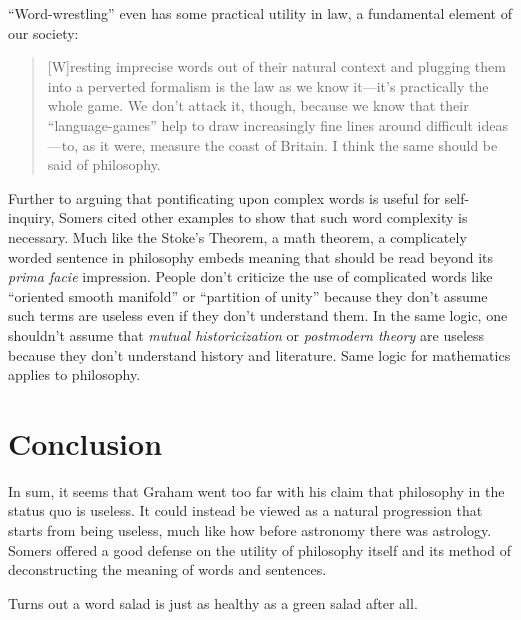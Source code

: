 \documentclass[12pt]{article}
\begin{document}
\enquote{Word-wrestling} even has some practical utility in law, a fundamental element of our society:

\begin{quotation}
	[W]resting imprecise words out of their natural context and plugging them into a perverted formalism is the law as we know it—it’s practically the whole game. We don’t attack it, though, because we know that their “language-games” help to draw increasingly fine lines around difficult ideas—to, as it were, measure the coast of Britain. I think the same should be said of philosophy.
\end{quotation}

Further to arguing that pontificating upon complex words is useful for self-inquiry, Somers cited other examples to show that such word complexity is necessary. Much like the Stoke's Theorem, a math theorem, a complicately worded sentence in philosophy embeds meaning that should be read beyond its \emph{prima facie} impression. People don't criticize the use of complicated words like \enquote{oriented smooth manifold} or \enquote{partition of unity} because they don't assume such terms are useless even if they don't understand them. In the same logic, one shouldn't assume that \emph{mutual historicization} or \emph{postmodern theory} are useless because they don't understand history and literature. Same logic for mathematics applies to philosophy.

\section{Conclusion}

In sum, it seems that Graham went too far with his claim that philosophy in the status quo is useless. It could instead be viewed as a natural progression that starts from being useless, much like how before astronomy there was astrology. Somers offered a good defense on the utility of philosophy itself and its method of deconstructing the meaning of words and sentences.

Turns out a word salad is just as healthy as a green salad after all.

\end{document}
